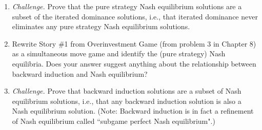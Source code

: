 \begin{enumerate}
\begin{enumerate}
    \end{enumerate}










\item \emph{Challenge.} Prove that the pure strategy Nash equilibrium solutions are a subset of the iterated dominance solutions, i.e., that iterated dominance never eliminates any pure strategy Nash equilibrium solutions.










\item Rewrite Story \#1 from Overinvestment Game (from problem 3 in Chapter 8) as a simultaneous move game and identify the (pure strategy) Nash equilibria. Does your answer suggest anything about the relationship between backward induction and Nash equilibrium?









\item \emph{Challenge.} Prove that backward induction solutions are a subset of Nash equilibrium solutions, i.e., that any backward induction solution is also a Nash equilibrium solution. (Note: Backward induction is in fact a refinement of Nash equilibrium called ``subgame perfect Nash equilibrium".)


\end{enumerate}
